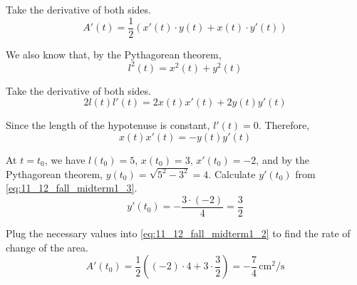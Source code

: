 \documentclass[a4paper, 12pt]{article}
\begin{document}
\begin{enumerate}[leftmargin=*,label=\textbf{\arabic*.}]
Take the derivative of both sides.
\begin{equation}A'(t) =\frac12\left(x'(t)\cdot y(t) + x(t)\cdot y'(t) \right)\label{eq:11_12_fall_midterm1_2}\end{equation}

We also know that, by the Pythagorean theorem,
\[l^2(t) = x^2(t)+y^2(t)\]

Take the derivative of both sides.
\[2l(t)l'(t)= 2x(t)x'(t)+2y(t)y'(t)\]

Since the length of the hypotenuse is constant, $l'(t) = 0$. Therefore,
\begin{equation}x(t)x'(t)=-y(t)y'(t)\label{eq:11_12_fall_midterm1_3}\end{equation}

At $t=t_0$, we have $l(t_0) = 5,\,x(t_0)=3,\,x'(t_0)=-2$, and by the Pythagorean theorem, $y(t_0)=\sqrt{5^2-3^2}=4$. Calculate $y'(t_0)$ from \eqref{eq:11_12_fall_midterm1_3}.
\[y'(t_0)=-\frac{3\cdot (-2)}4 = \frac32\]

Plug the necessary values into \eqref{eq:11_12_fall_midterm1_2} to find the rate of change of the area.
\[A'(t_0) =\frac12\left((-2)\cdot4+3\cdot\frac32\right)=\boxed{-\frac74\,\text{cm}^2/\text{s}}\]
\end{enumerate}
\end{document}
